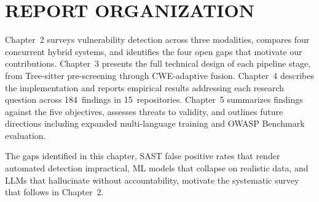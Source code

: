 \section{\uppercase{Report Organization}}

Chapter~2 surveys vulnerability detection across three modalities, compares four concurrent hybrid systems, and identifies the four open gaps that motivate our contributions.
Chapter~3 presents the full technical design of each pipeline stage, from Tree-sitter pre-screening through CWE-adaptive fusion.
Chapter~4 describes the implementation and reports empirical results addressing each research question across 184~findings in 15~repositories.
Chapter~5 summarizes findings against the five objectives, assesses threats to validity, and outlines future directions including expanded multi-language training and OWASP Benchmark evaluation.

The gaps identified in this chapter, SAST false positive rates that render automated detection impractical, ML models that collapse on realistic data, and LLMs that hallucinate without accountability, motivate the systematic survey that follows in Chapter~2.
